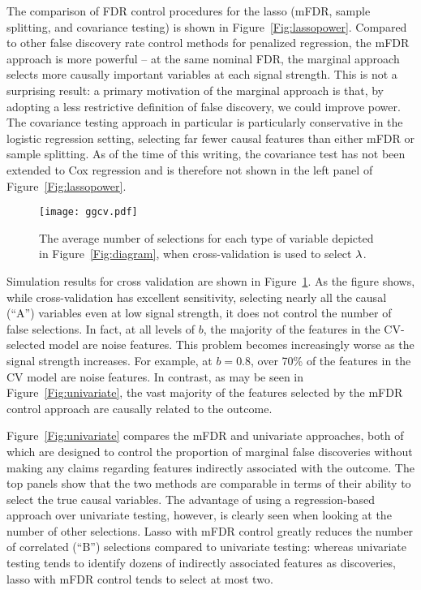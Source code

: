 The comparison of FDR control procedures for the lasso (mFDR, sample splitting, and covariance testing) is shown in Figure~\ref{Fig:lassopower}.  Compared to other false discovery rate control methods for penalized regression, the mFDR approach is more powerful -- at the same nominal FDR, the marginal approach selects more causally important variables at each signal strength.  This is not a surprising result: a primary motivation of the marginal approach is that, by adopting a less restrictive definition of false discovery, we could improve power.  The covariance testing approach in particular is particularly conservative in the logistic regression setting, selecting far fewer causal features than either mFDR or sample splitting.  As of the time of this writing, the covariance test has not been extended to Cox regression and is therefore not shown in the left panel of Figure~\ref{Fig:lassopower}.

\begin{figure} [!ht]
 \centering
  \texttt{[image: ggcv.pdf]}
  \caption{\label{Fig:cv} The average number of selections for each type of variable depicted in Figure~\ref{Fig:diagram}, when cross-validation is used to select $\lambda$.}
\end{figure}

Simulation results for cross validation are shown in Figure~\ref{Fig:cv}.  As the figure shows, while cross-validation has excellent sensitivity, selecting nearly all the causal (``A'') variables even at low signal strength, it does not control the number of false selections.  In fact, at all levels of $b$, the majority of the features in the CV-selected model are noise features.  This problem becomes increasingly worse as the signal strength increases.  For example, at $b=0.8$, over 70\% of the features in the CV model are noise features.  In contrast, as may be seen in Figure~\ref{Fig:univariate}, the vast majority of the features selected by the mFDR control approach are causally related to the outcome.

Figure~\ref{Fig:univariate} compares the mFDR and univariate approaches, both of which are designed to control the proportion of marginal false discoveries without making any claims regarding features indirectly associated with the outcome. The top panels show that the two methods are comparable in terms of their ability to select the true causal variables.  The advantage of using a regression-based approach over univariate testing, however, is clearly seen when looking at the number of other selections.  Lasso with mFDR control greatly reduces the number of correlated (``B'') selections compared to univariate testing: whereas univariate testing tends to identify dozens of indirectly associated features as discoveries, lasso with mFDR control tends to select at most two.

